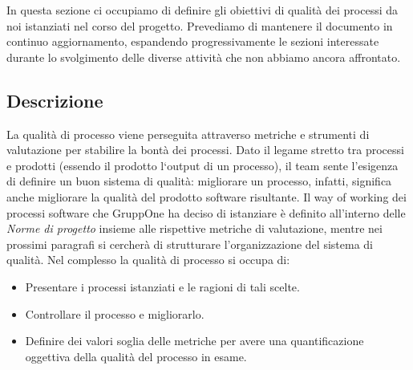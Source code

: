\documentclass[../piano-di-qualifica.tex]{subfiles}
\begin{document}
In questa sezione ci occupiamo di definire gli obiettivi di qualità dei processi da noi istanziati nel corso del progetto.
Prevediamo di mantenere il documento in continuo aggiornamento, espandendo progressivamente le sezioni interessate durante lo svolgimento delle diverse attività che non abbiamo ancora affrontato.

\subsection{Descrizione}%
\label{sub:descrizione}

La qualità di processo viene perseguita attraverso metriche e strumenti di valutazione per stabilire la bontà dei processi.
Dato il legame stretto tra processi e prodotti (essendo il prodotto l`output di un processo), il team sente l'esigenza di definire un buon sistema di qualità: migliorare un processo, infatti, significa anche migliorare la qualità del prodotto software risultante.
Il way of working dei processi software che GruppOne ha deciso di istanziare è definito all'interno delle \textit{Norme di progetto} insieme alle rispettive metriche di valutazione, mentre nei prossimi paragrafi si cercherà di strutturare l'organizzazione del sistema di qualità.
Nel complesso la qualità di processo si occupa di:
\begin{itemize}
  \item Presentare i processi istanziati e le ragioni di tali scelte.
  \item Controllare il processo e migliorarlo.
  \item Definire dei valori soglia delle metriche per avere una quantificazione oggettiva della qualità del processo in esame.
\end{itemize}




\end{document}
